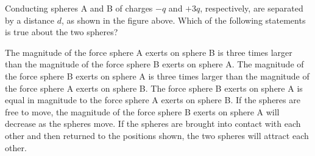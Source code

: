 \documentclass{../../../oss-apphys-exam}
\begin{document}



\begin{center}
\end{center}

\begin{questions}
  \question Conducting spheres A and B of charges $-q$ and $+3q$, respectively,
  are separated by a distance $d$, as shown in the figure above. Which of the
  following statements is true about the two spheres?
  \begin{choices}
    \choice The magnitude of the force sphere A exerts on sphere B is three
    times larger than the magnitude of the force sphere B exerts on sphere A.
    \choice The magnitude of the force sphere B exerts on sphere A is three
    times larger than the magnitude of the force sphere A exerts on sphere B.
    \choice The force sphere B exerts on sphere A is equal in magnitude to the
    force sphere A exerts on sphere B.
    \choice If the spheres are free to move, the magnitude of the force sphere
    B exerts on sphere A will decrease as the spheres move.
    \choice If the spheres are brought into contact with each other and then
    returned to the positions shown, the two spheres will attract each other.
  \end{choices}


\end{questions}
\end{document}
